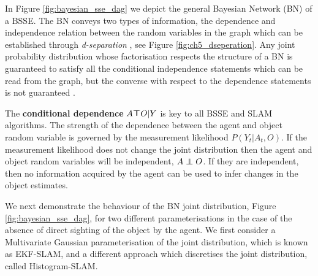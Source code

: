 In Figure \ref{fig:bayesian_sse_dag} we depict the general Bayesian Network (BN) of a BSSE. The BN conveys two types of
information, the dependence and independence relation between the random variables in the graph which can be established
through \textit{d-separation} \cite{BayesBall}, see Figure \ref{fig:ch5_dseperation}. Any joint probability distribution 
whose factorisation  respects the structure of a BN is guaranteed to satisfy all the conditional independence 
statements which can be read from the graph, but the converse with respect to the dependence statements is 
not guaranteed \cite[p.43]{barberBRML2012}. 

The \textbf{conditional dependence} $A \dependent O | Y$ is key to all BSSE and SLAM algorithms. The strength of the dependence 
between the agent and object random variable is governed by the measurement likelihood $P(Y_t|A_t,O)$. If the measurement likelihood does not change the 
joint distribution then the agent and object random variables will be independent, $A \independent O$. If they are independent, 
then no information acquired by the agent can be used to infer changes in the object estimates.


We next demonstrate the behaviour of the BN joint distribution, Figure \ref{fig:bayesian_sse_dag}, for two different parameterisations 
in the case of the absence of direct sighting of the object by the agent. We first consider a
Multivariate Gaussian parameterisation of the joint distribution, which is known as EKF-SLAM, and 
a different approach which discretises the joint distribution, called Histogram-SLAM.

